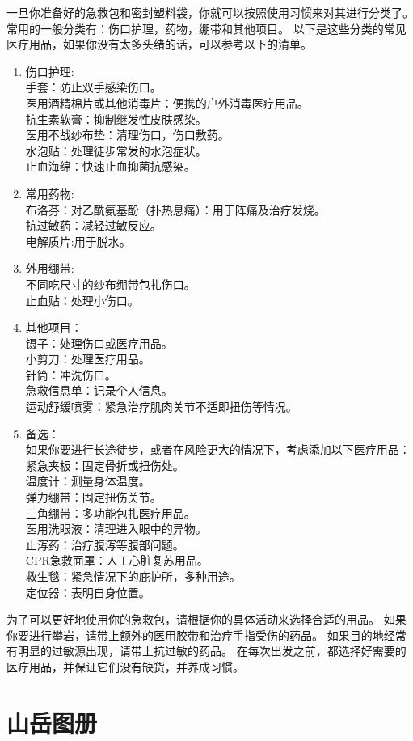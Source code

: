\documentclass[UTF8]{ctexbook}
\begin{document}
一旦你准备好的急救包和密封塑料袋，你就可以按照使用习惯来对其进行分类了。
常用的一般分类有：伤口护理，药物，绷带和其他项目。
以下是这些分类的常见医疗用品，如果你没有太多头绪的话，可以参考以下的清单。
\begin{enumerate}
    \item 伤口护理:\\
    手套：防止双手感染伤口。\\
    医用酒精棉片或其他消毒片：便携的户外消毒医疗用品。\\
    抗生素软膏：抑制继发性皮肤感染。\\
    医用不战纱布垫：清理伤口，伤口敷药。\\
    水泡贴：处理徒步常发的水泡症状。\\
    止血海绵：快速止血抑菌抗感染。
    \item 常用药物:\\
    布洛芬：对乙酰氨基酚（扑热息痛）：用于阵痛及治疗发烧。\\
    抗过敏药：减轻过敏反应。\\
    电解质片:用于脱水。
    \item 外用绷带:\\
    不同吃尺寸的纱布绷带包扎伤口。\\
    止血贴：处理小伤口。
    \item 其他项目：\\
    镊子：处理伤口或医疗用品。\\
    小剪刀：处理医疗用品。\\
    针筒：冲洗伤口。\\
    急救信息单：记录个人信息。\\
    运动舒缓喷雾：紧急治疗肌肉关节不适即扭伤等情况。
    \item 备选：\\
    如果你要进行长途徒步，或者在风险更大的情况下，考虑添加以下医疗用品：\\
    紧急夹板：固定骨折或扭伤处。\\
    温度计：测量身体温度。\\
    弹力绷带：固定扭伤关节。\\
    三角绷带：多功能包扎医疗用品。\\
    医用洗眼液：清理进入眼中的异物。\\
    止泻药：治疗腹泻等腹部问题。\\
    CPR急救面罩：人工心脏复苏用品。\\
    救生毯：紧急情况下的庇护所，多种用途。\\
    定位器：表明自身位置。
\end{enumerate}
为了可以更好地使用你的急救包，请根据你的具体活动来选择合适的用品。
如果你要进行攀岩，请带上额外的医用胶带和治疗手指受伤的药品。
如果目的地经常有明显的过敏源出现，请带上抗过敏的药品。 
在每次出发之前，都选择好需要的医疗用品，并保证它们没有缺货，并养成习惯。

\chapter{山岳图册}
\end{document}
